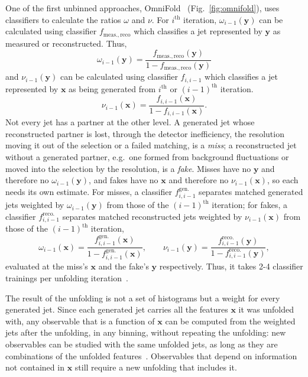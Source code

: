 One of the first unbinned approaches, OmniFold~\cite{PhysRevLett.124.182001} (Fig.~\ref{fig:omnifold}), uses classifiers to calculate the ratios \(\omega\) and \(\nu\). For \(i^\text{th}\) iteration, \(\omega_{i-1}(\mathbf{y})\) can be calculated using classifier \(f_\mathrm{meas., reco}\) which classifies a jet represented by \(\mathbf{y}\) as measured or reconstructed. Thus, 
\begin{equation}
	\omega_{i-1}(\mathbf{y}) = \frac{f_\mathrm{meas., reco}(\mathbf{y})}{1 - f_\mathrm{meas., reco}(\mathbf{y})}
\end{equation}
and \(\nu_{i-1}(\mathbf{y})\) can be calculated using classifier \(f_{i, i-1}\) which classifies a jet represented by \(\mathbf{x}\) as being generated from \(i^\text{th}\) or \((i-1)^\text{th}\) iteration. 
\begin{equation}
	\nu_{i-1}(\mathbf{x}) = \frac{f_{i, i-1}(\mathbf{x})}{1-f_{i, i-1}(\mathbf{x})}.
\end{equation}
Not every jet has a partner at the other level.
%
A generated jet whose reconstructed partner is lost, through the detector inefficiency, the resolution moving it out of the selection or a failed matching, is a \emph{miss}; a reconstructed jet without a generated partner, e.g.\ one formed from background fluctuations or moved into the selection by the resolution, is a \emph{fake}.
%
Misses have no \(\mathbf{y}\) and therefore no \(\omega_{i-1}(\mathbf{y})\), and fakes have no \(\mathbf{x}\) and therefore no \(\nu_{i-1}(\mathbf{x})\), so each needs its own estimate.
%
For misses, a classifier \(f^\mathrm{gen.}_{i, i-1}\) separates matched generated jets weighted by \(\omega_{i-1}(\mathbf{y})\) from those of the \((i-1)^\text{th}\) iteration; for fakes, a classifier \(f^\mathrm{reco.}_{i, i-1}\) separates matched reconstructed jets weighted by \(\nu_{i-1}(\mathbf{x})\) from those of the \((i-1)^\text{th}\) iteration,
\begin{equation}
	\omega_{i-1}(\mathbf{x}) = \frac{f^\mathrm{gen.}_{i, i-1}(\mathbf{x})}{1-f^\mathrm{gen.}_{i, i-1}(\mathbf{x})} ,
	\qquad
	\nu_{i-1}(\mathbf{y}) = \frac{f^\mathrm{reco.}_{i, i-1}(\mathbf{y})}{1-f^\mathrm{reco.}_{i, i-1}(\mathbf{y})} ,
\end{equation}
evaluated at the miss's \(\mathbf{x}\) and the fake's \(\mathbf{y}\) respectively. Thus, it takes 2-4 classifier trainings per unfolding iteration~\cite{andreassen2021scaffoldingsimulationsdeeplearning}.

The result of the unfolding is not a set of histograms but a weight for every generated jet.
%
Since each generated jet carries all the features \(\mathbf{x}\) it was unfolded with, any observable that is a function of \(\mathbf{x}\) can be computed from the weighted jets after the unfolding, in any binning, without repeating the unfolding: new observables can be studied with the same unfolded jets, as long as they are combinations of the unfolded features~\cite{PhysRevLett.124.182001,Canelli_2026}.
%
Observables that depend on information not contained in \(\mathbf{x}\) still require a new unfolding that includes it.
